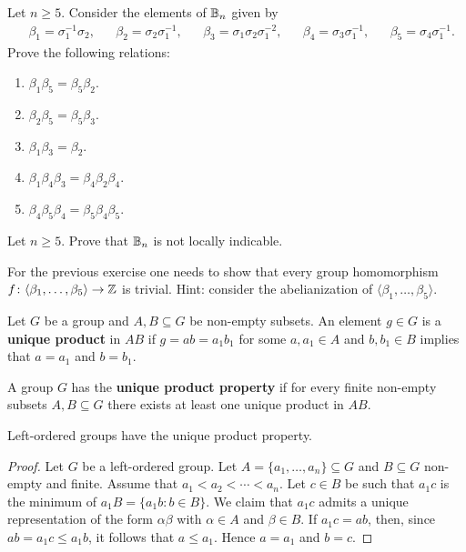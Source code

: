 \begin{exercise}
\label{xca:relations}
    Let $n\geq5$. Consider the elements of $\mathbb{B}_n$ given by 
    \begin{align*}
        &\beta_1=\sigma_1^{-1}\sigma_2,
        &&\beta_2=\sigma_2\sigma_1^{-1}, 
        &&\beta_3=\sigma_1\sigma_2\sigma_1^{-2},
        &&\beta_4=\sigma_3\sigma_1^{-1}, 
        &&\beta_5=\sigma_4\sigma_1^{-1}.
    \end{align*}
    Prove the following relations:
    \begin{enumerate}
        \item $\beta_1\beta_5=\beta_5\beta_2$.
        \item $\beta_2\beta_5=\beta_5\beta_3$.
        \item $\beta_1\beta_3=\beta_2$.
        \item $\beta_1\beta_4\beta_3=\beta_4\beta_2\beta_4$.
        \item $\beta_4\beta_5\beta_4=\beta_5\beta_4\beta_5$.
    \end{enumerate}
\end{exercise}

\begin{exercise}
    Let $n\geq 5$. 
    Prove that $\mathbb{B}_n$ is not locally indicable.
\end{exercise}

For the previous exercise one needs to show that
every group homomorphism $f\colon \langle\beta_1,\dots,\beta_5\rangle\to\mathbb{Z}$ is trivial. Hint: consider
the abelianization of $\langle\beta_1,\dots,\beta_5\rangle$. 


Let $G$ be a group and $A,B\subseteq G$ be non-empty subsets. 
An element $g\in G$ is a \textbf{unique product} in $AB$ if $g=ab=a_1b_1$ for some
$a,a_1\in
A$ and $b,b_1\in B$ implies that $a=a_1$ and $b=b_1$.

\begin{definition}
	A group $G$ has the \textbf{unique product property} if 
	for every finite non-empty subsets $A,B\subseteq G$ there exists at least one
	unique product in $AB$.
\end{definition}

\begin{proposition}
    Left-ordered groups have the unique product property.
\end{proposition}

\begin{proof}
    Let $G$ be a left-ordered group. 
	Let $A=\{a_1,\dots,a_n\}\subseteq G$ and $B\subseteq G$ non-empty and finite. 
	Assume that $a_1<a_2<\cdots<a_n$. Let $c\in B$ be such that $a_1c$ is the 
	minimum of $a_1B=\{a_1b:b\in B\}$. We claim that $a_1c$ admits a unique
	representation of the form $\alpha\beta$ with $\alpha\in A$ and 
	$\beta\in B$. If $a_1c=ab$, then, since $ab=a_1c\leq a_1b$, it follows that 
	$a\leq a_1$. Hence $a=a_1$ and $b=c$. 
\end{proof}

